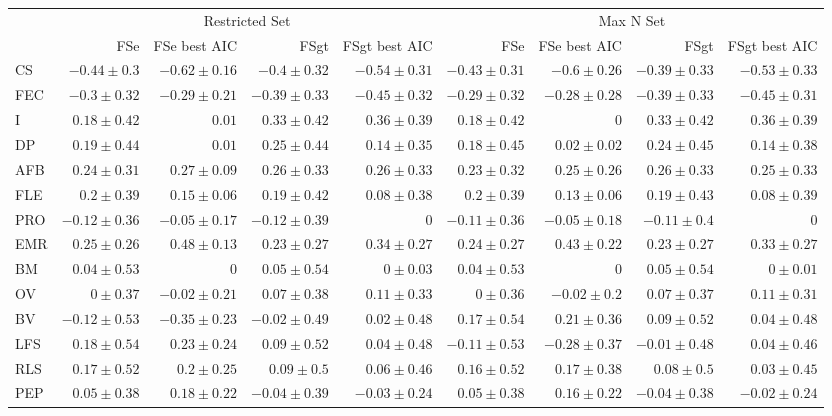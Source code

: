 \begin{landscape}
\begin{table}
\begin{footnotesize}
\begin{tabular}{@{}l|rrrr|rrrr@{}}
\toprule
  & \multicolumn{4}{c|}{Restricted Set} & \multicolumn{4}{c}{Max N Set}\\
  & FSe & FSe best AIC & FSgt & FSgt best AIC & FSe & FSe best AIC & FSgt & FSgt best AIC\\
\midrule
CS & $-0.44 \pm 0.3$ & $-0.62 \pm 0.16$ & $-0.4 \pm 0.32$ & $-0.54 \pm 0.31$ & $-0.43 \pm 0.31$ & $-0.6 \pm 0.26$ & $-0.39 \pm 0.33$ & $-0.53 \pm 0.33$\\
FEC & $-0.3 \pm 0.32$ & $-0.29 \pm 0.21$ & $-0.39 \pm 0.33$ & $-0.45 \pm 0.32$ & $-0.29 \pm 0.32$ & $-0.28 \pm 0.28$ & $-0.39 \pm 0.33$ & $-0.45 \pm 0.31$\\
I & $0.18 \pm 0.42$ & $0.01$ & $0.33 \pm 0.42$ & $0.36 \pm 0.39$ & $0.18 \pm 0.42$ & $0$ & $0.33 \pm 0.42$ & $0.36 \pm 0.39$\\
DP & $0.19 \pm 0.44$ & $0.01$ & $0.25 \pm 0.44$ & $0.14 \pm 0.35$ & $0.18 \pm 0.45$ & $0.02 \pm 0.02$ & $0.24 \pm 0.45$ & $0.14 \pm 0.38$\\
AFB & $0.24 \pm 0.31$ & $0.27 \pm 0.09$ & $0.26 \pm 0.33$ & $0.26 \pm 0.33$ & $0.23 \pm 0.32$ & $0.25 \pm 0.26$ & $0.26 \pm 0.33$ & $0.25 \pm 0.33$\\
FLE & $0.2 \pm 0.39$ & $0.15 \pm 0.06$ & $0.19 \pm 0.42$ & $0.08 \pm 0.38$ & $0.2 \pm 0.39$ & $0.13 \pm 0.06$ & $0.19 \pm 0.43$ & $0.08 \pm 0.39$\\
PRO & $-0.12 \pm 0.36$ & $-0.05 \pm 0.17$ & $-0.12 \pm 0.39$ & $0$ & $-0.11 \pm 0.36$ & $-0.05 \pm 0.18$ & $-0.11 \pm 0.4$ & $0$\\
EMR & $0.25 \pm 0.26$ & $0.48 \pm 0.13$ & $0.23 \pm 0.27$ & $0.34 \pm 0.27$ & $0.24 \pm 0.27$ & $0.43 \pm 0.22$ & $0.23 \pm 0.27$ & $0.33 \pm 0.27$\\
BM & $0.04 \pm 0.53$ & $0$ & $0.05 \pm 0.54$ & $0 \pm 0.03$ & $0.04 \pm 0.53$ & $0$ & $0.05 \pm 0.54$ & $0 \pm 0.01$\\
OV & $0 \pm 0.37$ & $-0.02 \pm 0.21$ & $0.07 \pm 0.38$ & $0.11 \pm 0.33$ & $0 \pm 0.36$ & $-0.02 \pm 0.2$ & $0.07 \pm 0.37$ & $0.11 \pm 0.31$\\
BV & $-0.12 \pm 0.53$ & $-0.35 \pm 0.23$ & $-0.02 \pm 0.49$ & $0.02 \pm 0.48$ & $0.17 \pm 0.54$ & $0.21 \pm 0.36$ & $0.09 \pm 0.52$ & $0.04 \pm 0.48$\\
LFS & $0.18 \pm 0.54$ & $0.23 \pm 0.24$ & $0.09 \pm 0.52$ & $0.04 \pm 0.48$ & $-0.11 \pm 0.53$ & $-0.28 \pm 0.37$ & $-0.01 \pm 0.48$ & $0.04 \pm 0.46$\\
RLS & $0.17 \pm 0.52$ & $0.2 \pm 0.25$ & $0.09 \pm 0.5$ & $0.06 \pm 0.46$ & $0.16 \pm 0.52$ & $0.17 \pm 0.38$ & $0.08 \pm 0.5$ & $0.03 \pm 0.45$\\
PEP & $0.05 \pm 0.38$ & $0.18 \pm 0.22$ & $-0.04 \pm 0.39$ & $-0.03 \pm 0.24$ & $0.05 \pm 0.38$ & $0.16 \pm 0.22$ & $-0.04 \pm 0.38$ & $-0.02 \pm 0.24$\\
\bottomrule
\end{tabular}


\end{footnotesize}
\end{table}
\end{landscape}
